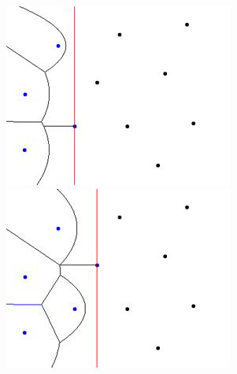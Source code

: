 \begin{figure}[H]
    \begin{center}
        \begin{minipage}[h]{0.3\linewidth}
            \includegraphics[width=1\linewidth]{fortunes-algo-03.jpg}
        \end{minipage}
        \hfill
        \begin{minipage}[h]{0.3\linewidth}
            \includegraphics[width=1\linewidth]{fortunes-algo-04.jpg}
        \end{minipage}
        \hfill
        \begin{minipage}[h]{0.3\linewidth}

\end{minipage}
\end{center}
\end{figure}
